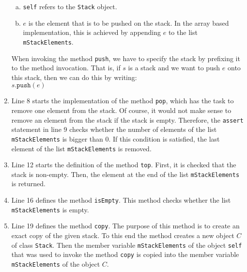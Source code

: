 \begin{enumerate}
      \begin{enumerate}[(a)]
      \item \texttt{self} refers to the \texttt{Stack} object.
      \item $e$ is the element that is to be pushed on the stack.  In the array based
            implementation, this is achieved by appending $e$ to the list \texttt{mStackElements}.
      \end{enumerate} 
      When invoking the method \texttt{push}, we have to specify the stack by prefixing it to the method
      invocation.  That is, if $s$ is a stack and we want to push $e$ onto this stack, then we can do this by
      writing: 
      \\[0.2cm]
      \hspace*{1.3cm}
      $s\texttt{.push}(e)$
\item Line 8 starts the implementation of the method \texttt{pop}, which has the task to remove 
      one element from the stack.  Of course, it would not make sense to remove an element from the
      stack if the stack is empty.  Therefore, the \texttt{assert} statement in line 9 checks
      whether the number of elements of the list \texttt{mStackElements} is bigger than $0$.
      If this condition is satisfied, the last element of the list \texttt{mStackElements} is removed.
\item Line 12 starts the definition of the method \texttt{top}.  First, it is checked that the stack
      is non-empty.  Then, the element at the end of the list \texttt{mStackElements} is returned.
\item Line 16 defines the method \texttt{isEmpty}.  This method checks whether the list
      \texttt{mStackElements} is empty.
\item Line 19 defines the method \texttt{copy}.  The purpose of this method is to create an exact
      copy of the given stack.  To this end the method creates a new object $C$ of class \texttt{Stack}.
      Then the member variable \texttt{mStackElements} of the object \texttt{self} that was used to invoke
      the method \texttt{copy} is copied into the member variable \texttt{mStackElements} of the object $C$.


\end{enumerate}
